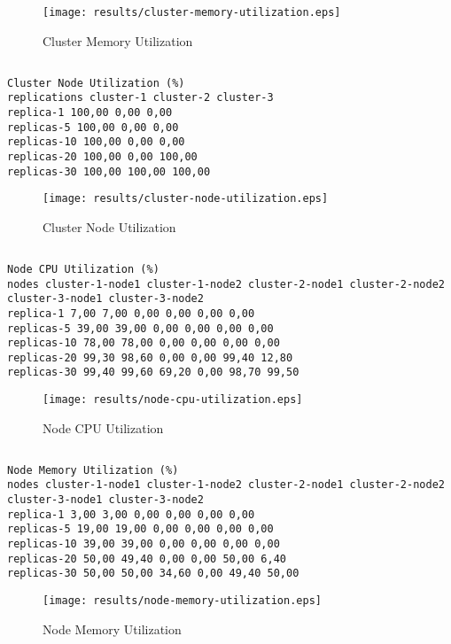 \documentclass{elsart}
\begin{document}
\begin{figure}[ht]
\centering
\texttt{[image: results/cluster-memory-utilization.eps]}
\caption{Cluster Memory Utilization}\label{fig:cluster-memory-utilization.eps}
\end{figure}

\subsection{}

\begin{lstlisting}[caption={Cluster Node Utilization}]
Cluster Node Utilization (%)
replications cluster-1 cluster-2 cluster-3
replica-1 100,00 0,00 0,00
replicas-5 100,00 0,00 0,00
replicas-10 100,00 0,00 0,00
replicas-20 100,00 0,00 100,00
replicas-30 100,00 100,00 100,00
\end{lstlisting}

\begin{figure}[ht]
\centering
\texttt{[image: results/cluster-node-utilization.eps]}
\caption{Cluster Node Utilization}\label{fig:cluster-node-utilization.eps}
\end{figure}

\subsection{}

\begin{lstlisting}[caption={Node CPU Utilization}]
Node CPU Utilization (%)
nodes cluster-1-node1 cluster-1-node2 cluster-2-node1 cluster-2-node2 cluster-3-node1 cluster-3-node2
replica-1 7,00 7,00 0,00 0,00 0,00 0,00
replicas-5 39,00 39,00 0,00 0,00 0,00 0,00
replicas-10 78,00 78,00 0,00 0,00 0,00 0,00
replicas-20 99,30 98,60 0,00 0,00 99,40 12,80
replicas-30 99,40 99,60 69,20 0,00 98,70 99,50
\end{lstlisting}

\begin{figure}[ht]
\centering
\texttt{[image: results/node-cpu-utilization.eps]}
\caption{Node CPU Utilization}\label{fig:node-cpu-utilization.eps}
\end{figure}

\subsection{}

\begin{lstlisting}[caption={Node Memory Utilization}]
Node Memory Utilization (%)
nodes cluster-1-node1 cluster-1-node2 cluster-2-node1 cluster-2-node2 cluster-3-node1 cluster-3-node2
replica-1 3,00 3,00 0,00 0,00 0,00 0,00
replicas-5 19,00 19,00 0,00 0,00 0,00 0,00
replicas-10 39,00 39,00 0,00 0,00 0,00 0,00
replicas-20 50,00 49,40 0,00 0,00 50,00 6,40
replicas-30 50,00 50,00 34,60 0,00 49,40 50,00
\end{lstlisting}

\begin{figure}[ht]
\centering
\texttt{[image: results/node-memory-utilization.eps]}
\caption{Node Memory Utilization}\label{fig:node-memory-utilization.eps}
\end{figure}
\end{document}
